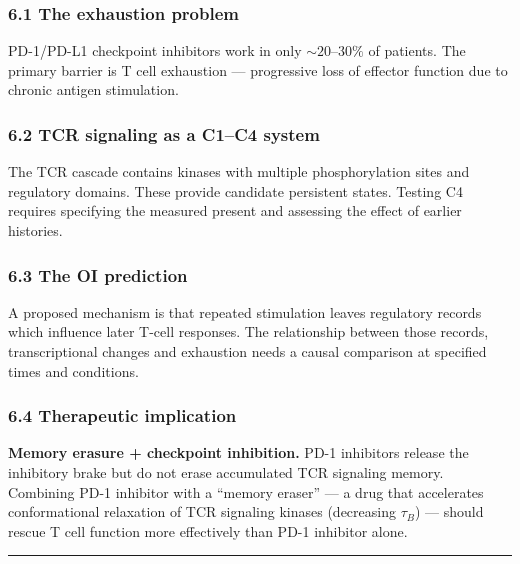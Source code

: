 \documentclass[
]{article}
\begin{document}
\hypertarget{the-exhaustion-problem}{%
\subsubsection{6.1 The exhaustion
problem}\label{the-exhaustion-problem}}

PD-1/PD-L1 checkpoint inhibitors work in only \(\sim 20\)--\(30\%\) of
patients. The primary barrier is T cell exhaustion --- progressive loss
of effector function due to chronic antigen stimulation.

\hypertarget{tcr-signaling-as-a-c1c4-system}{%
\subsubsection{6.2 TCR signaling as a C1--C4
system}\label{tcr-signaling-as-a-c1c4-system}}

The TCR cascade contains kinases with multiple phosphorylation sites and
regulatory domains. These provide candidate persistent states. Testing
C4 requires specifying the measured present and assessing the effect of
earlier histories.

\hypertarget{the-oi-prediction-2}{%
\subsubsection{6.3 The OI prediction}\label{the-oi-prediction-2}}

A proposed mechanism is that repeated stimulation leaves regulatory
records which influence later T-cell responses. The relationship between
those records, transcriptional changes and exhaustion needs a causal
comparison at specified times and conditions.

\hypertarget{therapeutic-implication-1}{%
\subsubsection{6.4 Therapeutic
implication}\label{therapeutic-implication-1}}

\textbf{Memory erasure + checkpoint inhibition.} PD-1 inhibitors release
the inhibitory brake but do not erase accumulated TCR signaling memory.
Combining PD-1 inhibitor with a ``memory eraser'' --- a drug that
accelerates conformational relaxation of TCR signaling kinases
(decreasing \(\tau_B\)) --- should rescue T cell function more
effectively than PD-1 inhibitor alone.

\begin{center}\rule{0.5\linewidth}{0.5pt}\end{center}
\end{document}

